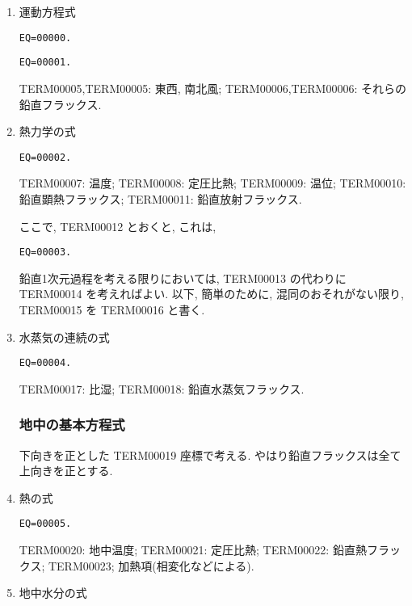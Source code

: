 \begin{enumerate}
\item 運動方程式

\begin{verbatim}
EQ=00000.
\end{verbatim}
\begin{verbatim}
EQ=00001.
\end{verbatim}

TERM00005,TERM00005: 東西, 南北風; 
TERM00006,TERM00006: それらの鉛直フラックス.

\item 熱力学の式

\begin{verbatim}
EQ=00002.
\end{verbatim}

TERM00007: 温度; 
TERM00008: 定圧比熱; 
TERM00009: 温位;
TERM00010: 鉛直顕熱フラックス;
TERM00011: 鉛直放射フラックス.

ここで, TERM00012 とおくと, これは,
\begin{verbatim}
EQ=00003.
\end{verbatim}

鉛直1次元過程を考える限りにおいては,
TERM00013 の代わりに TERM00014 を考えればよい.
以下, 簡単のために, 混同のおそれがない限り,
TERM00015 を TERM00016 と書く.

\item 水蒸気の連続の式

\begin{verbatim}
EQ=00004.
\end{verbatim}

TERM00017: 比湿; 
TERM00018: 鉛直水蒸気フラックス.

\subsubsection{地中の基本方程式}

下向きを正とした TERM00019 座標で考える. 
やはり鉛直フラックスは全て上向きを正とする.

\item 熱の式

\begin{verbatim}
EQ=00005.
\end{verbatim}

TERM00020: 地中温度; TERM00021: 定圧比熱; 
TERM00022: 鉛直熱フラックス;
TERM00023; 加熱項(相変化などによる).

\item 地中水分の式


\end{enumerate}
